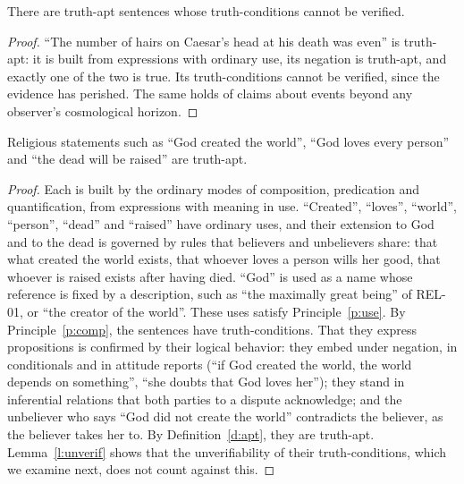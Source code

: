 \documentclass{situationist-preprint}
\begin{document}
\begin{lemma}\label{l:unverif}
There are truth-apt sentences whose truth-conditions cannot be verified.
\end{lemma}

\begin{proof}
\enquote{The number of hairs on Caesar's head at his death was even} is truth-apt: it is built from expressions with ordinary use, its negation is truth-apt, and exactly one of the two is true. Its truth-conditions cannot be verified, since the evidence has perished. The same holds of claims about events beyond any observer's cosmological horizon.
\end{proof}

\begin{theorem}\label{t:main}
Religious statements such as \enquote{God created the world}, \enquote{God loves every person} and \enquote{the dead will be raised} are truth-apt.
\end{theorem}

\begin{proof}
Each is built by the ordinary modes of composition, predication and quantification, from expressions with meaning in use. \enquote{Created}, \enquote{loves}, \enquote{world}, \enquote{person}, \enquote{dead} and \enquote{raised} have ordinary uses, and their extension to God and to the dead is governed by rules that believers and unbelievers share: that what created the world exists, that whoever loves a person wills her good, that whoever is raised exists after having died. \enquote{God} is used as a name whose reference is fixed by a description, such as \enquote{the maximally great being} of REL-01, or \enquote{the creator of the world}. These uses satisfy Principle~\ref{p:use}. By Principle~\ref{p:comp}, the sentences have truth-conditions. That they express propositions is confirmed by their logical behavior: they embed under negation, in conditionals and in attitude reports (\enquote{if God created the world, the world depends on something}, \enquote{she doubts that God loves her}); they stand in inferential relations that both parties to a dispute acknowledge; and the unbeliever who says \enquote{God did not create the world} contradicts the believer, as the believer takes her to. By Definition~\ref{d:apt}, they are truth-apt. Lemma~\ref{l:unverif} shows that the unverifiability of their truth-conditions, which we examine next, does not count against this.
\end{proof}
\end{document}
